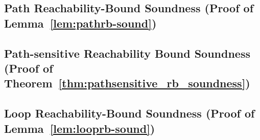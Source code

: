 \subsection{Path Reachability-Bound Soundness (Proof of Lemma~\ref{lem:pathrb-sound})}
\label{apdx:pathrb-sound}

\clearpage

\subsection{Path-sensitive Reachability Bound Soundness (Proof of Theorem~\ref{thm:pathsensitive_rb_soundness})}
\label{apdx:psrb-sound}

\clearpage

\subsection{Loop Reachability-Bound Soundness (Proof of Lemma~\ref{lem:looprb-sound})}
\label{apdx:looprb-sound}

\clearpage


